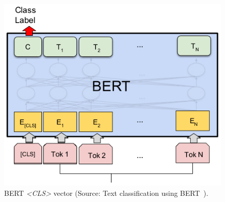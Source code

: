 \begin{figure}[h!]
    \centering
    \includegraphics[width=0.7\linewidth]{content/resources/images/background/bert_class.png}
    \caption{BERT \textit{<CLS>} vector (Source: Text classification using BERT~\cite{web-bert}).}
    \label{fig:chapter2-bert}
\end{figure}
